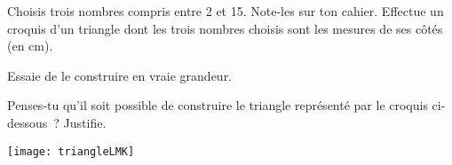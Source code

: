
\begin{activite}

\begin{partie}
Choisis trois nombres compris entre 2 et 15. Note-les sur ton cahier. Effectue un croquis d'un triangle dont les trois nombres choisis sont les mesures de ses côtés (en cm).
\end{partie}

\begin{partie}
Essaie de le construire en vraie grandeur.
\end{partie}

\begin{partie}
Penses-tu qu'il soit possible de construire le triangle représenté par le croquis ci-dessous ? Justifie.

\texttt{[image: triangleLMK]}
\end{partie}

\end{activite}


